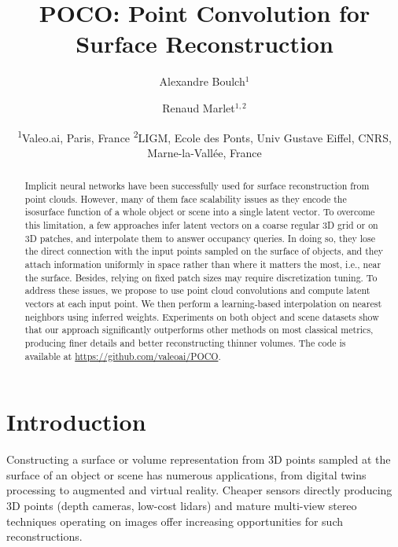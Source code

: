 \documentclass[10pt,twocolumn,letterpaper]{article}
\newcommand\OURS{{POCO}}
\newcommand{\titletext}{\OURS: Point Convolution for Surface Reconstruction}
\begin{document}
\title{\titletext}

\author{
Alexandre Boulch$^1$
\and 
Renaud Marlet$^{1,2}$
\and
\large
\hspace{-3mm}\textsuperscript{1}Valeo.ai, Paris, France  \hspace{1mm} \textsuperscript{2}LIGM, Ecole des Ponts, Univ Gustave Eiffel, CNRS, Marne-la-Vall\'ee, France
}

\maketitle

\begin{abstract}
Implicit neural networks have been successfully used for surface reconstruction from point clouds. However, many of them face scalability issues as they encode the isosurface function of a whole object or scene into a single latent vector. To overcome this limitation, a few approaches infer latent vectors on a coarse regular 3D grid or on 3D patches, and interpolate them to answer occupancy queries. In doing so, they lose the direct connection with the input points sampled on the surface of objects, and they attach information uniformly in space rather than where it matters the most, i.e., near the surface. Besides, relying on fixed patch sizes may require discretization tuning. To address these issues, we propose to use point cloud convolutions and compute latent vectors at each input point. We then perform a learning-based interpolation on nearest neighbors using inferred weights. Experiments on both object and scene datasets show that our approach significantly outperforms other methods on most classical metrics, producing finer details and better reconstructing thinner volumes.
The code is available at \url{https://github.com/valeoai/POCO}. \end{abstract}

\section{Introduction}

Constructing a surface or volume representation from 3D points sampled at the surface of an object or scene has numerous applications, from digital twins processing to augmented and virtual reality. Cheaper sensors directly producing 3D points (depth cameras, low-cost lidars) and
mature multi-view stereo techniques \cite{Schoenberger2016CVPR,Schoenberger2016ECCV} operating on images offer increasing opportunities for such reconstructions.
\end{document}
